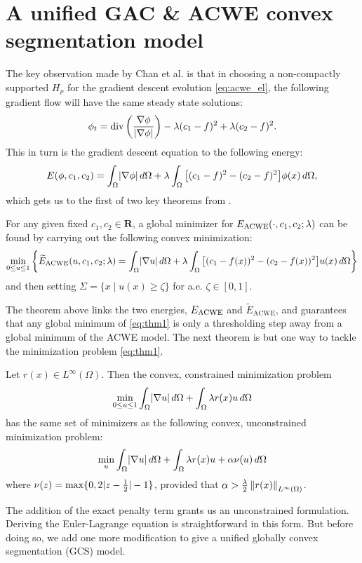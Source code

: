 \section{A unified GAC \& ACWE convex segmentation model}
The key observation made by Chan et al. \cite{chan2006algorithms} is that in choosing a non-compactly supported $H_\rho$ for the gradient descent evolution \eqref{eq:acwe_el}, the following gradient flow will have the same steady state solutions: 
\begin{align*}
\phi_t = \operatorname{div}\left(\frac{\nabla \phi}{\lvert\nabla \phi\rvert} \right) 
- \lambda (c_1 - f)^2 + \lambda (c_2 - f)^2 .
\end{align*}
This in turn is the gradient descent equation to the following energy:
\begin{align}
E(\phi, c_1, c_2) 
= \int_\Omega \lvert\nabla \phi\rvert \,d\Omega 
+ \lambda \int_\Omega \big[ (c_1 - f)^2 - (c_2 - f)^2 \big] \phi(x) \,d\Omega ,
\label{eq:mod_acwe}
\end{align}
which gets us to the first of two key theorems from \cite{chan2006algorithms}.

\begin{thm}
	For any given fixed $c_1, c_2 \in \mathbf{R}$, a global minimizer for $E_\textrm{ACWE}(\cdot, c_1, c_2; \lambda)$ can be found by carrying out the following convex minimization: 
	\begin{align}
	\min_{0\leq u \leq 1}\left\{
		\widetilde E_{\textrm{ACWE}} (u, c_1, c_2; \lambda)
		=
		\int_{\Omega} \lvert\nabla u\rvert \,d\Omega 
	+ \lambda\int_{\Omega} \big[ (c_1 - f(x) )^2 - (c_2 - f(x))^2 \big] u(x) \,d\Omega
	\right\}
	\label{eq:thm1}
	\end{align}
	and then setting $\Sigma = \{ x \mid u(x) \geq \zeta \}$ for a.e. $\zeta \in [0, 1]$.
	\label{thm:1}
\end{thm}
The theorem above links the two energies, $E_\textrm{ACWE}$ and $\widetilde E_\textrm{ACWE}$,
and guarantees that any global minimum of \eqref{eq:thm1} is only a thresholding step away from a global minimum of the ACWE model. The next theorem is but one way to tackle the minimization problem \eqref{eq:thm1}.

\begin{thm}
	Let $r(x) \in L^\infty(\Omega)$. Then the convex, constrained minimization problem
	\begin{align*}
	\min_{0 \leq u \leq 1} \int_{\Omega} \lvert\nabla u\rvert \,d\Omega +  \int_{\Omega} \lambda r(x) u \,d\Omega 
	\end{align*}
	has the same set of minimizers as the following convex, unconstrained minimization problem:
	\begin{align*}
	\min_u \int_{\Omega} \lvert\nabla u\rvert \,d\Omega + \int_{\Omega} \lambda r(x) u + \alpha \nu(u) \,d\Omega 
	\end{align*}
	where $\nu(z) = \max\{ 0 , 2\lvert z - \frac{1}{2} \rvert - 1\}$, provided that $\alpha > \frac{\lambda}{2}\left\lVert r(x)\right\rVert_{L^\infty(\Omega)}$.
	\label{thm:2}
\end{thm}
The addition of the exact penalty term \cite{hiriart1993convexI,hiriart1993convexII} grants us an unconstrained formulation. Deriving the Euler-Lagrange equation is straightforward in this form. But before doing so, we add one more modification to give a unified globally convex segmentation (GCS) model.

